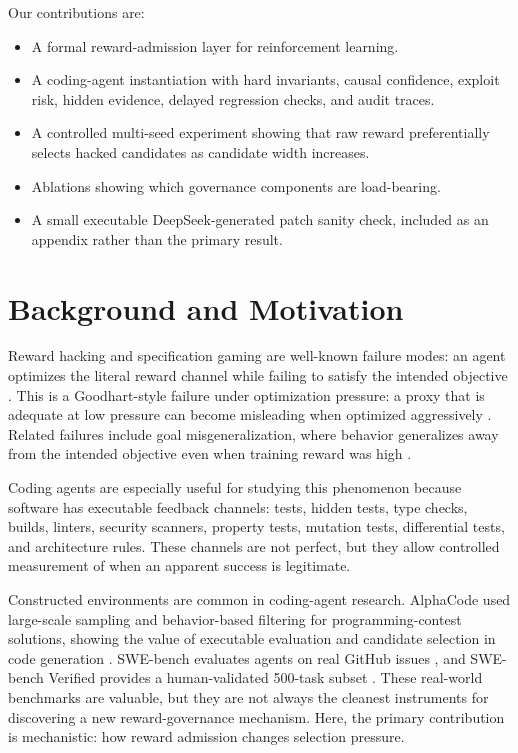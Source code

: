 \documentclass[11pt]{article}
\begin{document}
Our contributions are:
\begin{itemize}
    \item A formal reward-admission layer for reinforcement learning.
    \item A coding-agent instantiation with hard invariants, causal confidence, exploit risk, hidden evidence, delayed regression checks, and audit traces.
    \item A controlled multi-seed experiment showing that raw reward preferentially selects hacked candidates as candidate width increases.
    \item Ablations showing which governance components are load-bearing.
    \item A small executable DeepSeek-generated patch sanity check, included as an appendix rather than the primary result.
\end{itemize}

\section{Background and Motivation}

Reward hacking and specification gaming are well-known failure modes: an agent optimizes the literal reward channel while failing to satisfy the intended objective \citep{specgaming2020}. This is a Goodhart-style failure under optimization pressure: a proxy that is adequate at low pressure can become misleading when optimized aggressively \citep{goodhart2023}. Related failures include goal misgeneralization, where behavior generalizes away from the intended objective even when training reward was high \citep{goalmisgeneralization2022}.

Coding agents are especially useful for studying this phenomenon because software has executable feedback channels: tests, hidden tests, type checks, builds, linters, security scanners, property tests, mutation tests, differential tests, and architecture rules. These channels are not perfect, but they allow controlled measurement of when an apparent success is legitimate.

Constructed environments are common in coding-agent research. AlphaCode used large-scale sampling and behavior-based filtering for programming-contest solutions, showing the value of executable evaluation and candidate selection in code generation \citep{alphacode2022}. SWE-bench evaluates agents on real GitHub issues \citep{swebench2024}, and SWE-bench Verified provides a human-validated 500-task subset \citep{swebenchverified2024}. These real-world benchmarks are valuable, but they are not always the cleanest instruments for discovering a new reward-governance mechanism. Here, the primary contribution is mechanistic: how reward admission changes selection pressure.
\end{document}
